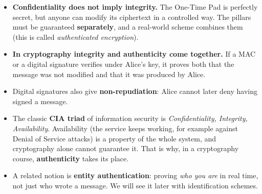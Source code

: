 \begin{framedobs}{}
  \begin{itemize}
    \item \textbf{Confidentiality does not imply integrity.} The One-Time Pad is perfectly secret, but anyone can modify its ciphertext in a controlled way. The pillars must be guaranteed \textbf{separately}, and a real-world scheme combines them (this is called \textit{authenticated encryption}).
    \item \textbf{In cryptography integrity and authenticity come together.} If a MAC or a digital signature verifies under Alice's key, it proves both that the message was not modified and that it was produced by Alice.
    \item Digital signatures also give \textbf{non-repudiation}: Alice cannot later deny having signed a message.
    \item The classic \textbf{CIA triad} of information security is \textit{Confidentiality, Integrity, Availability}. Availability (the service keeps working, for example against Denial of Service attacks) is a property of the whole system, and cryptography alone cannot guarantee it. That is why, in a cryptography course, \textbf{authenticity} takes its place.
    \item A related notion is \textbf{entity authentication}: proving \textit{who you are} in real time, not just who wrote a message. We will see it later with identification schemes.
  \end{itemize}
\end{framedobs}
